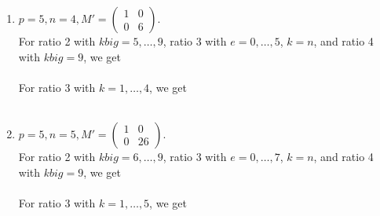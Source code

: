\documentclass[letterpaper,12pt]{article}
\begin{document}
\begin{enumerate}
\item $p=5, n=4, M' = \begin{pmatrix}
1 & 0 \\ 0 & 6
\end{pmatrix}.$ \\
For ratio 2 with $kbig = 5, \dots, 9$, ratio 3 with $e = 0, \dots, 5$, $k=n$, and ratio 4 with $kbig = 9$, we get \\
 \\
For ratio 3 with $k = 1, \dots, 4$, we get \\
 \\

\item $p=5, n=5, M' = \begin{pmatrix}
1 & 0 \\ 0 & 26
\end{pmatrix}.$ \\
For ratio 2 with $kbig = 6, \dots, 9$, ratio 3 with $e = 0, \dots, 7$, $k=n$, and ratio 4 with $kbig = 9$, we get \\
 \\
For ratio 3 with $k = 1, \dots, 5$, we get \\
 \\


\end{enumerate}
\end{document}
